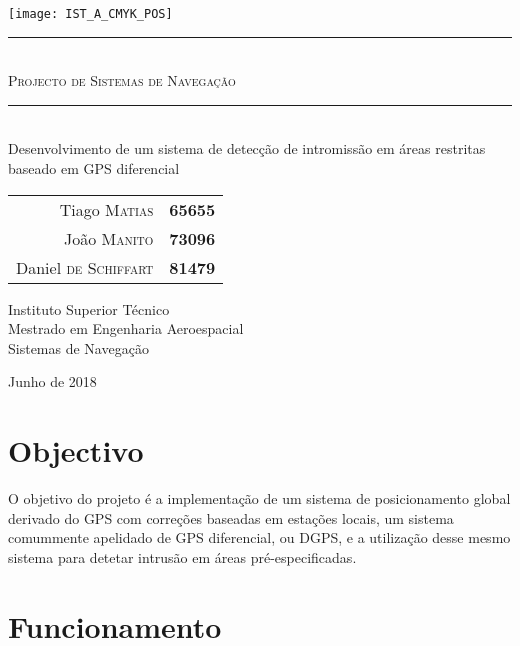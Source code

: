 \documentclass{article}
\begin{document}
\thispagestyle{empty}

\texttt{[image: IST\_A\_CMYK\_POS]}
	
\begin{center}
	\vspace{70mm} %
	\rule{\linewidth}{0.5pt} \\
    \vspace{2mm}
	\Huge \textsc{Projecto de Sistemas de Navegação} \\
	\rule{\linewidth}{2pt} \\
	\vspace{8mm} %
	\LARGE Desenvolvimento de um sistema de detecção de intromissão em áreas restritas baseado em GPS diferencial
	
	\vspace{\fill} %
	\large
	
	\begin{tabular}{r l}
		Tiago \textsc{Matias} & \textbf{65655} \\
		João \textsc{Manito} & \textbf{73096} \\
		Daniel \textsc{de Schiffart} & \textbf{81479}
	\end{tabular}
	
	\vspace{10mm} %
	\Large Instituto Superior Técnico \\
	Mestrado em Engenharia Aeroespacial \\
	\vspace{1mm}
	\large Sistemas de Navegação
	
	\vspace{10mm} %
	\Large Junho de 2018
\end{center}

\newpage

\section{Objectivo}

O objetivo do projeto é a implementação de um sistema de
posicionamento global derivado do GPS com correções baseadas em
estações locais, um sistema comummente apelidado de GPS diferencial,
ou DGPS, e a utilização desse mesmo sistema para detetar intrusão em
áreas pré-especificadas.

\section{Funcionamento}
\end{document}
